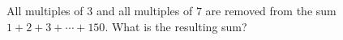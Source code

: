 All multiples of $3$ and all multiples of $7$ are removed from the sum $1+2+3+\cdots+150$. What is the resulting sum?
